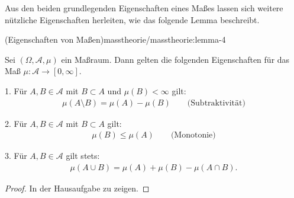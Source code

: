 \par
Aus den beiden grundlegenden Eigenschaften eines Maßes lassen sich weitere nützliche Eigenschaften herleiten, wie das folgende Lemma beschreibt.
\begin{lemma}{(Eigenschaften von Maßen)}{masstheorie/masstheorie:lemma-4}



\par
Sei \((\Omega, \mathcal{A}, \mu)\) ein Maßraum.
Dann gelten die folgenden Eigenschaften für das Maß \(\mu \colon \mathcal{A} \rightarrow [0,\infty]\).

\par
1. Für \(A,B \in \mathcal{A}\) mit \(B \subset A\) und \(\mu(B) < \infty\) gilt:
\begin{align*}
\mu(A \setminus B) = \mu(A) - \mu(B) \qquad \text{(Subtraktivität)}
\end{align*}
\par
2. Für \(A,B \in \mathcal{A}\) mit \(B \subset A\) gilt:
\begin{align*}
\mu(B) \leq \mu(A) \qquad \text{(Monotonie)}
\end{align*}
\par
3. Für \(A,B \in \mathcal{A}\) gilt stets:
\begin{align*}
\mu(A \cup B) = \mu(A) + \mu(B) - \mu(A \cap B).
\end{align*}\end{lemma}

\begin{proof}
 In der Hausaufgabe zu zeigen.
\end{proof}

